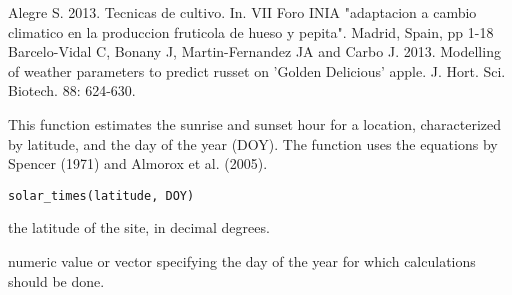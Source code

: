 \documentclass[a4paper]{book}
\begin{document}
%
\begin{References}\relax
Alegre S. 2013. Tecnicas de cultivo. In. VII Foro INIA "adaptacion a 
cambio climatico en la produccion fruticola de hueso y pepita". Madrid, 
Spain, pp 1-18
Barcelo-Vidal C, Bonany J, Martin-Fernandez JA and Carbo J. 2013. 
Modelling of weather parameters to predict russet on 'Golden Delicious'
apple. J. Hort. Sci. Biotech. 88: 624-630.
\end{References}
%
\begin{Examples}
\end{Examples}
%
\begin{Description}\relax
This function estimates the sunrise and sunset hour
for a location, characterized by latitude, and the
day of the year (DOY). The function uses the equations by
Spencer (1971) and Almorox et al. (2005).
\end{Description}
%
\begin{Usage}
\begin{verbatim}
solar_times(latitude, DOY)
\end{verbatim}
\end{Usage}
%
\begin{Arguments}
\begin{ldescription}
\item[\code{latitude}] the latitude of the site, in decimal degrees.

\item[\code{DOY}] numeric value or vector specifying the
day of the year for which calculations should be done.
\end{ldescription}
\end{Arguments}
\end{document}
